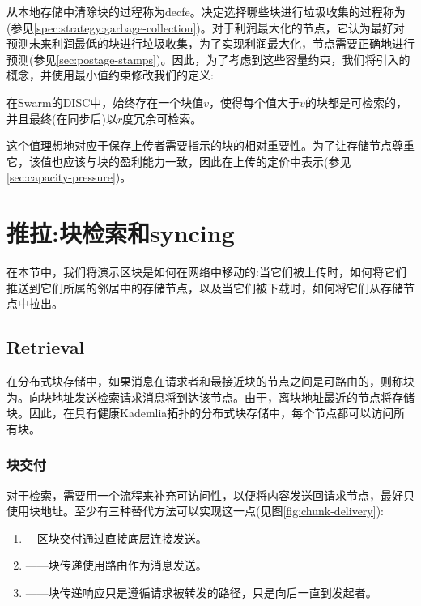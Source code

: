 从本地存储中清除块的过程称为decfe。决定选择哪些块进行垃圾收集的过程称为(参见\ref{spec:strategy:garbage-collection})。对于利润最大化的节点，它认为最好对预测未来利润最低的块进行垃圾收集，为了实现利润最大化，节点需要正确地进行预测(参见\ref{sec:postage-stamps})。因此，为了考虑到这些容量约束，我们将引入的概念，并使用最小值约束修改我们的定义:

在Swarm的DISC中，始终存在一个块值$v$，使得每个值大于$v$的块都是可检索的，并且最终(在同步后)以$r$度冗余可检索。

这个值理想地对应于保存上传者需要指示的块的相对重要性。为了让存储节点尊重它，该值也应该与块的盈利能力一致，因此在上传的定价中表示(参见\ref{sec:capacity-pressure})。


\section{推拉:块检索和syncing\statusgreen}\label{sec:push-and-pull}
\green{}
在本节中，我们将演示区块是如何在网络中移动的:当它们被上传时，如何将它们推送到它们所属的邻居中的存储节点，以及当它们被下载时，如何将它们从存储节点中拉出。

\subsection{Retrieval\statusgreen}\label{sec:retrieval}

在分布式块存储中，如果消息在请求者和最接近块的节点之间是可路由的，则称块为。向块地址发送检索请求消息将到达该节点。由于，离块地址最近的节点将存储块。因此，在具有健康Kademlia拓扑的分布式块存储中，每个节点都可以访问所有块。

\subsubsection{块交付}

对于检索，需要用一个流程来补充可访问性，以便将内容发送回请求节点，最好只使用块地址。至少有三种替代方法可以实现这一点(见图\ref{fig:chunk-delivery}):

\begin{enumerate}
    \item {}—区块交付通过直接底层连接发送。 
    \item {}——块传递使用路由作为消息发送。
    \item {}——块传递响应只是遵循请求被转发的路径，只是向后一直到发起者。
\end{enumerate}


